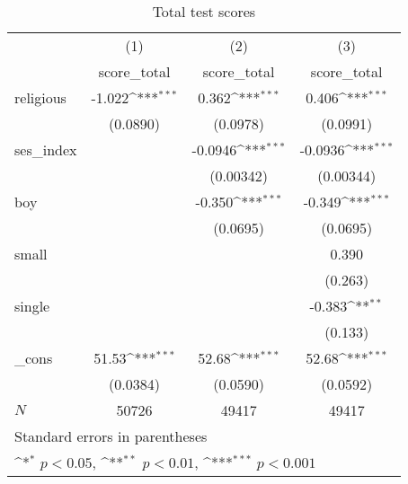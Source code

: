 \begin{table}[htbp]\centering
\def\sym#1{\ifmmode^{#1}\else\(^{#1}\)\fi}
\caption{Total test scores}
\begin{tabular}{l*{3}{c}}
\hline\hline
            &\multicolumn{1}{c}{(1)}&\multicolumn{1}{c}{(2)}&\multicolumn{1}{c}{(3)}\\
            &\multicolumn{1}{c}{score\_total}&\multicolumn{1}{c}{score\_total}&\multicolumn{1}{c}{score\_total}\\
\hline
religious   &      -1.022\sym{***}&       0.362\sym{***}&       0.406\sym{***}\\
            &    (0.0890)         &    (0.0978)         &    (0.0991)         \\
[1em]
ses\_index   &                     &     -0.0946\sym{***}&     -0.0936\sym{***}\\
            &                     &   (0.00342)         &   (0.00344)         \\
[1em]
boy         &                     &      -0.350\sym{***}&      -0.349\sym{***}\\
            &                     &    (0.0695)         &    (0.0695)         \\
[1em]
small       &                     &                     &       0.390         \\
            &                     &                     &     (0.263)         \\
[1em]
single      &                     &                     &      -0.383\sym{**} \\
            &                     &                     &     (0.133)         \\
[1em]
\_cons      &       51.53\sym{***}&       52.68\sym{***}&       52.68\sym{***}\\
            &    (0.0384)         &    (0.0590)         &    (0.0592)         \\
\hline
\(N\)       &       50726         &       49417         &       49417         \\
\hline\hline
\multicolumn{4}{l}{\footnotesize Standard errors in parentheses}\\
\multicolumn{4}{l}{\footnotesize \sym{*} \(p<0.05\), \sym{**} \(p<0.01\), \sym{***} \(p<0.001\)}\\
\end{tabular}
\end{table}
